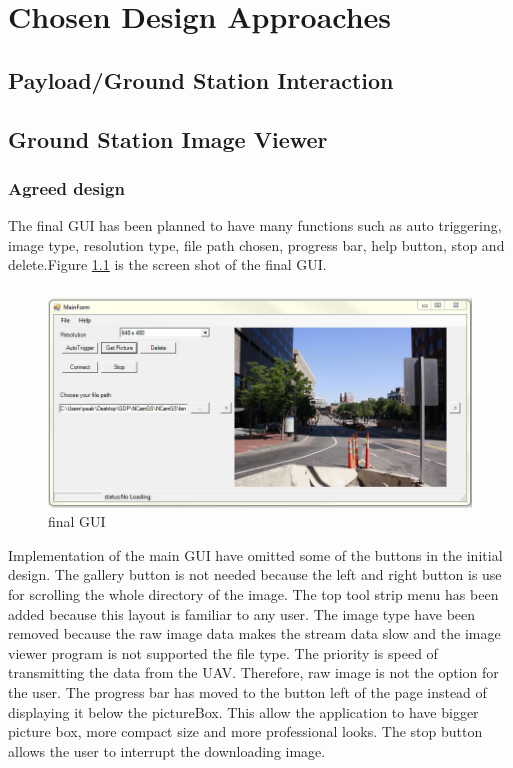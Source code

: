 \chapter{Chosen Design Approaches}




\section{Payload/Ground Station Interaction}

\section{Ground Station Image Viewer}
\subsection{Agreed design}

The final GUI has been planned to have many functions such as auto triggering, image type, resolution type, file path chosen, progress bar, help button, stop and delete.Figure \ref{finalGUI} is the screen shot of the final GUI.

\begin{figure}[!hbtp]
\begin{center}
\includegraphics[scale=0.5]{figures/finalGUI.png} 
\end{center}
\caption{final GUI\label{finalGUI}}
\end{figure}
Implementation of the main GUI have omitted some of the buttons in the initial design. The gallery button is not needed because the left and right button is use for scrolling the whole directory of the image. The top tool strip menu has been added because this layout is familiar to any user. The image type have been removed because the raw image data makes the stream data slow and the image viewer program is not supported the file type. The priority is speed of transmitting the data from the UAV. Therefore, raw image is not the option for the user. The progress bar has moved to the button left of the page instead of displaying it below the pictureBox.
This allow the application to have bigger picture box, more compact size and more professional looks.
The stop button allows the user to interrupt the downloading image.
